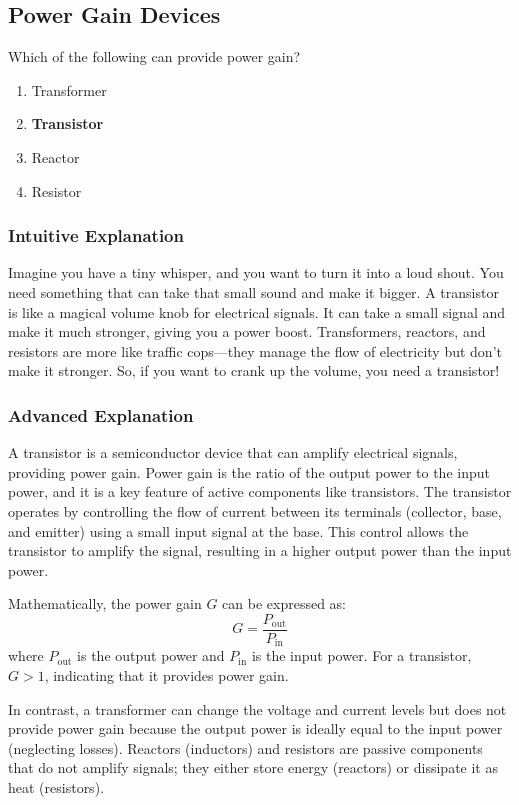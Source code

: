 \subsection{Power Gain Devices}
\label{T6B10}

\begin{tcolorbox}[colback=gray!10!white,colframe=black!75!black,title=T6B10]
Which of the following can provide power gain?
\begin{enumerate}[label=\Alph*)]
    \item Transformer
    \item \textbf{Transistor}
    \item Reactor
    \item Resistor
\end{enumerate}
\end{tcolorbox}

\subsubsection{Intuitive Explanation}
Imagine you have a tiny whisper, and you want to turn it into a loud shout. You need something that can take that small sound and make it bigger. A transistor is like a magical volume knob for electrical signals. It can take a small signal and make it much stronger, giving you a power boost. Transformers, reactors, and resistors are more like traffic cops—they manage the flow of electricity but don’t make it stronger. So, if you want to crank up the volume, you need a transistor!

\subsubsection{Advanced Explanation}
A transistor is a semiconductor device that can amplify electrical signals, providing power gain. Power gain is the ratio of the output power to the input power, and it is a key feature of active components like transistors. The transistor operates by controlling the flow of current between its terminals (collector, base, and emitter) using a small input signal at the base. This control allows the transistor to amplify the signal, resulting in a higher output power than the input power.

Mathematically, the power gain \( G \) can be expressed as:
\[
G = \frac{P_{\text{out}}}{P_{\text{in}}}
\]
where \( P_{\text{out}} \) is the output power and \( P_{\text{in}} \) is the input power. For a transistor, \( G > 1 \), indicating that it provides power gain.

In contrast, a transformer can change the voltage and current levels but does not provide power gain because the output power is ideally equal to the input power (neglecting losses). Reactors (inductors) and resistors are passive components that do not amplify signals; they either store energy (reactors) or dissipate it as heat (resistors).

